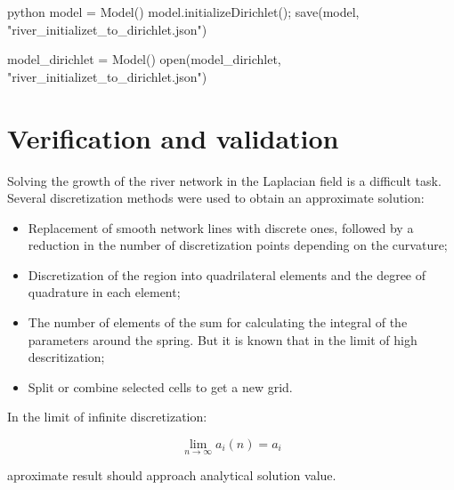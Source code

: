 \documentclass[]{pracamgr}
\begin{document}
    \begin{mintedbox}{python}
      model = Model()
      model.initializeDirichlet();
      save(model, "river_initializet_to_dirichlet.json")
      
      model_dirichlet = Model()
      open(model_dirichlet, "river_initializet_to_dirichlet.json")\end{mintedbox}


  \chapter{Verification and validation}

    Solving the growth of the river network in the Laplacian field is a difficult task. Several discretization methods were used to obtain an approximate solution: 
    
    \begin{itemize}
      \item Replacement of smooth network lines with discrete ones, followed by a reduction in the number of discretization points depending on the curvature;
      \item Discretization of the region into quadrilateral elements and the degree of quadrature in each element;
      \item The number of elements of the sum for calculating the integral of the parameters around the spring. But it is known that in the limit of high descritization;
      \item Split or combine selected cells to get a new grid.
    \end{itemize}
    
    In the limit of infinite discretization: 

    \begin{equation}
      \label{convergence}
      \lim_{n \to \infty} a_i(n)  = a_i
    \end{equation}

    aproximate result should approach analytical solution value.
    
\end{document}
